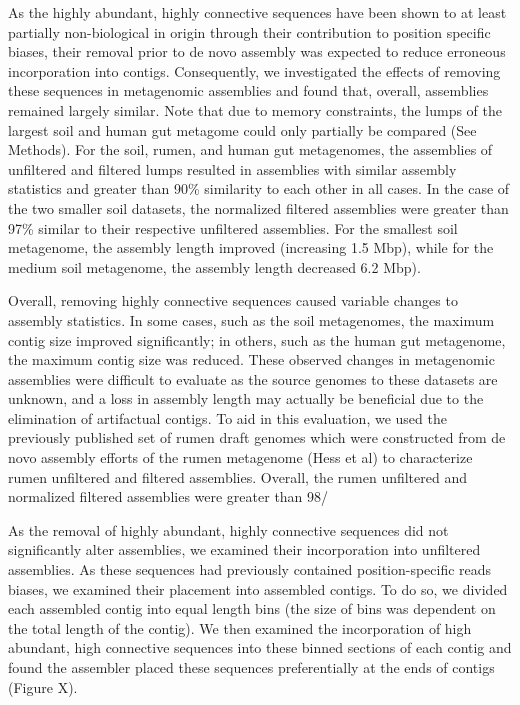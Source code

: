 \documentclass[11pt]{article} %
\begin{document}
As the highly abundant, highly connective sequences have been shown to at least partially non-biological in origin through their contribution to position specific biases, their removal prior to de novo assembly was expected to reduce erroneous incorporation into contigs.  Consequently, we investigated the effects of removing these sequences in metagenomic assemblies and found that, overall, assemblies remained largely similar.  Note that due to memory constraints, the lumps of the largest soil and human gut metagome could only partially be compared (See Methods).  For the soil, rumen, and human gut metagenomes, the assemblies of unfiltered and filtered lumps resulted in assemblies with similar assembly statistics and greater than 90\% similarity to each other in all cases.  In the case of the two smaller soil datasets, the normalized filtered assemblies were greater than 97\% similar to their respective unfiltered assemblies.  For the smallest soil metagenome, the assembly length improved (increasing 1.5 Mbp), while for the medium soil metagenome, the assembly length decreased 6.2 Mbp).  

Overall, removing highly connective sequences caused variable changes to assembly statistics.  In some cases, such as the soil metagenomes, the maximum contig size improved significantly; in others, such as the human gut metagenome, the maximum contig size was reduced. These observed changes in metagenomic assemblies were difficult to evaluate as the source genomes to these datasets are unknown, and a loss in assembly length may actually be beneficial due to the elimination of artifactual contigs.  To aid in this evaluation, we used the previously published set of rumen draft genomes which were constructed from de novo assembly efforts of the rumen metagenome (Hess et al) to characterize rumen unfiltered and filtered assemblies.  Overall, the rumen unfiltered and normalized filtered assemblies were greater than 98/%

As the removal of highly abundant, highly connective sequences did not significantly alter assemblies, we examined their incorporation into unfiltered assemblies.  As these sequences had previously contained position-specific reads biases, we examined their placement into assembled contigs.  To do so, we divided each assembled contig into equal length bins (the size of bins was dependent on the total length of the contig).  We then examined the incorporation of high abundant, high connective sequences into these binned sections of each contig and found the assembler placed these sequences preferentially at the ends of contigs (Figure X).
\end{document}
